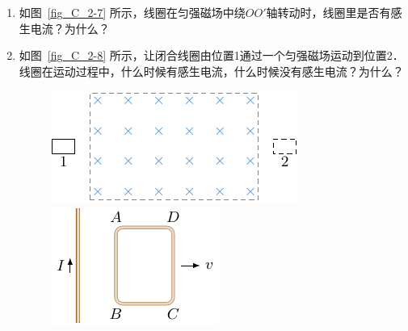 \begin{enumerate}
    \item 如图~\ref{fig_C_2-7} 所示，线圈在匀强磁场中绕$OO'$轴转动时，线圈里是否有感生电流？为什么？
    \item 如图~\ref{fig_C_2-8} 所示，让闭合线圈由位置1通过一个匀强磁场运动到位置2．线圈在运动过程中，什么时候有感生电流，什么时候没有感生电流？为什么？
\begin{figure}[htbp]
    \centering
    \begin{minipage}[t]{0.48\textwidth}
        \centering
        \includegraphics{fig/C/2-8.pdf}
        \caption{}\label{fig_C_2-8}
    \end{minipage}
    \begin{minipage}[t]{0.48\textwidth}
        \centering
        \includegraphics{fig/C/2-9.pdf}
        \caption{}\label{fig_C_2-9}
    \end{minipage}
\end{figure}



\end{enumerate}
